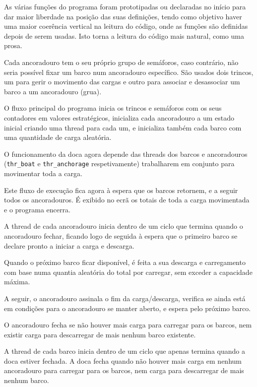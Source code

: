 \documentclass[12pt,a4paper]{report}
\begin{document}
As várias funções do programa foram prototipadas ou declaradas no início para dar maior liberdade na posição das suas definições, tendo como objetivo haver uma maior coerência vertical na leitura do código, onde as funções são definidas depois de serem usadas. Isto torna a leitura do código mais natural, como uma prosa.

Cada ancoradouro tem o seu próprio grupo de semáforos, caso contrário, não seria possível fixar um barco num ancoradouro específico. São usados dois trincos, um para gerir o movimento das cargas e outro para  associar e desassociar um barco a um ancoradouro (grua).

O fluxo principal do programa inicia os trincos e semáforos com os seus contadores em valores estratégicos, inicializa cada ancoradouro a um estado inicial criando uma thread para cada um, e inicializa também cada barco com uma quantidade de carga aleatória.

O funcionamento da doca agora depende das threads dos barcos e ancoradouros (\verb+thr_boat+ e \verb+thr_anchorage+ respetivamente) trabalharem em conjunto para movimentar toda a carga.

Este fluxo de execução fica agora à espera que os barcos retornem, e a seguir todos os ancoradouros. É exibido no ecrã os totais de toda a carga movimentada e o programa encerra.


A thread de cada ancoradouro inicia dentro de um ciclo que termina quando o ancoradouro fechar, ficando logo de seguida à espera que o primeiro barco se declare pronto a iniciar a carga e descarga.

Quando o próximo barco ficar disponível, é feita a sua descarga e carregamento com base numa quantia aleatória do total por carregar, sem exceder a capacidade máxima.

A seguir, o ancoradouro assinala o fim da carga/descarga, verifica se ainda está em condições para o ancoradouro se manter aberto, e espera pelo próximo barco.

O ancoradouro fecha se não houver mais carga para carregar para os barcos, nem existir carga para descarregar de mais nenhum barco existente.


A thread de cada barco inicia dentro de um ciclo que apenas termina quando a doca estiver fechada. A doca fecha quando não houver mais carga em nenhum ancoradouro para carregar para os barcos, nem carga para descarregar de mais nenhum barco.
\end{document}
